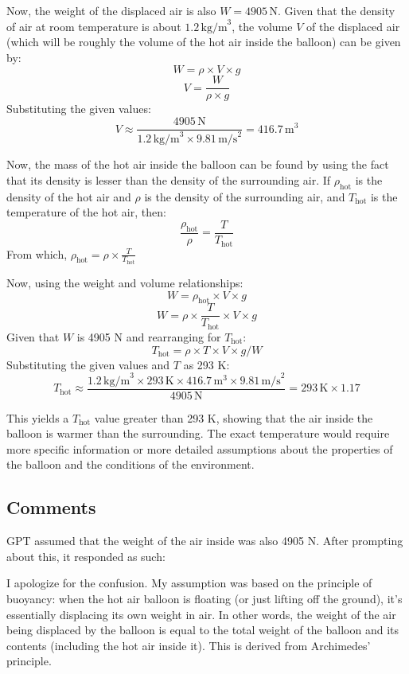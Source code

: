 \documentclass[12pt]{article}
\begin{document}
Now, the weight of the displaced air is also \( W = 4905 \, \text{N} \). Given that the density of air at room temperature is about \(1.2 \, \text{kg/m}^3\), the volume \( V \) of the displaced air (which will be roughly the volume of the hot air inside the balloon) can be given by:
\[ W = \rho \times V \times g \]
\[ V = \frac{W}{\rho \times g} \]
Substituting the given values:
\[ V \approx \frac{4905 \, \text{N}}{1.2 \, \text{kg/m}^3 \times 9.81 \, \text{m/s}^2} = 416.7 \, \text{m}^3 \]

Now, the mass of the hot air inside the balloon can be found by using the fact that its density is lesser than the density of the surrounding air. If \( \rho_{\text{hot}} \) is the density of the hot air and \( \rho \) is the density of the surrounding air, and \( T_{\text{hot}} \) is the temperature of the hot air, then:
\[ \frac{\rho_{\text{hot}}}{\rho} = \frac{T}{T_{\text{hot}}} \]
From which, \( \rho_{\text{hot}} = \rho \times \frac{T}{T_{\text{hot}}} \)

Now, using the weight and volume relationships:
\[ W = \rho_{\text{hot}} \times V \times g \]
\[ W = \rho \times \frac{T}{T_{\text{hot}}} \times V \times g \]
Given that \( W \) is 4905 N and rearranging for \( T_{\text{hot}} \):
\[ T_{\text{hot}} = \rho \times T \times V \times g / W \]
Substituting the given values and \( T \) as 293 K:
\[ T_{\text{hot}} \approx \frac{1.2 \, \text{kg/m}^3 \times 293 \, \text{K} \times 416.7 \, \text{m}^3 \times 9.81 \, \text{m/s}^2}{4905 \, \text{N}} = 293 \, \text{K} \times 1.17 \]

This yields a \( T_{\text{hot}} \) value greater than 293 K, showing that the air inside the balloon is warmer than the surrounding. The exact temperature would require more specific information or more detailed assumptions about the properties of the balloon and the conditions of the environment.

\subsection*{Comments}

GPT assumed that the weight of the air inside was also 4905 N. After prompting about this, it responded as such: 

I apologize for the confusion. My assumption was based on the principle of buoyancy: when the hot air balloon is floating (or just lifting off the ground), it's essentially displacing its own weight in air. In other words, the weight of the air being displaced by the balloon is equal to the total weight of the balloon and its contents (including the hot air inside it). This is derived from Archimedes' principle.
\end{document}
